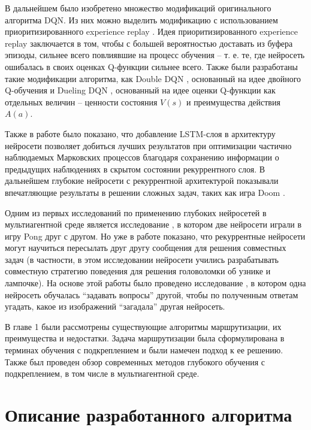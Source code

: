 \documentclass[specification, annotation]{itmo-student-thesis}
\begin{document}
В дальнейшем было изобретено множество модификаций оригинального алгоритма DQN.
Из них можно выделить модификацию с использованием приоритизированного
experience replay \cite{schaul2015prioritized}. Идея приоритизированного
experience replay заключается в том, чтобы с большей вероятностью доставать из
буфера эпизоды, сильнее всего повлиявшие на процесс обучения -- т. е. те,
где нейросеть ошибалась в своих оценках Q-функции сильнее всего.
Также были разработаны такие модификации алгоритма, как Double
DQN \cite{van2016deep}, основанный на идее двойного
Q-обучения \cite{hasselt2010double} и Dueling DQN \cite{wang2015dueling},
основанный на идее оценки Q-функции как отдельных величин -- ценности состояния
$V(s)$ и преимущества действия $A(a)$.

Также в работе \cite{hausknecht2015deep} было показано, что добавление
LSTM-слоя \cite{hochreiter1997long} в архитектуру нейросети позволяет добиться
лучших результатов при оптимизации частично наблюдаемых Марковских процессов
благодаря сохранению информации о предыдущих наблюдениях в скрытом состоянии
рекуррентного слоя. В дальнейшем глубокие нейросети с рекуррентной архитектурой
показывали впечатляющие результаты в решении сложных задач, таких как игра
Doom \cite{lample2016playing}.

Одним из первых исследований по применению глубоких нейросетей в мультиагентной
среде является исследование \cite{tampuu2017multiagent}, в котором две нейросети
играли в игру Pong друг с другом. Но уже в работе \cite{foerster2016learning}
показано, что рекуррентные нейросети могут научиться пересылать друг другу сообщения для решения
совместных задач (в частности, в этом исследовании нейросети учились
разрабатывать совместную стратегию поведения для решения головоломки об узнике и
лампочке). На основе этой работы было проведено исследование
\cite{jorge2016learning}, в котором одна нейросеть обучалась
\enquote{задавать вопросы} другой, чтобы по полученным ответам угадать, какое из
изображений \enquote{загадала} другая нейросеть.

\chapterconclusion

В главе 1 были рассмотрены существующие алгоритмы маршрутизации, их преимущества
и недостатки. Задача маршрутизации была сформулирована в терминах обучения с
подкреплением и были намечен подход к ее решению. Также был проведен обзор
современных методов глубокого обучения с подкреплением, в том числе в
мультиагентной среде.

\finishrelatedwork

\chapter{Описание разработанного алгоритма}
\end{document}
